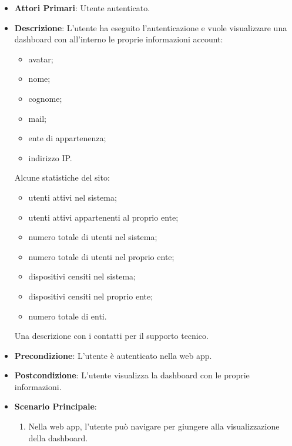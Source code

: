 		\begin{itemize}
			\item \textbf{Attori Primari}: Utente autenticato.
			\item \textbf{Descrizione}: L'utente ha eseguito l'autenticazione e vuole visualizzare una dashboard con all'interno le proprie informazioni account:
			\begin{itemize}
			 	\item avatar;
			 	\item nome;
			 	\item cognome;
			 	\item mail;
			 	\item ente di appartenenza;
			 	\item indirizzo IP.
			 \end{itemize}
			  Alcune statistiche del sito:
			  \begin{itemize}
			   	\item utenti attivi nel sistema;
			   	\item utenti attivi appartenenti al proprio ente;
			   	\item numero totale di utenti nel sistema;
			   	\item numero totale di utenti nel proprio ente;
			   	\item dispositivi censiti nel sistema;
			   	\item dispositivi censiti nel proprio ente;
			   	\item numero totale di enti.
			   \end{itemize}
			   Una descrizione con i contatti per il supporto tecnico.
			\item \textbf{Precondizione}: L'utente è autenticato nella web app.
			\item \textbf{Postcondizione}: L'utente visualizza la dashboard con le proprie informazioni.
			\item \textbf{Scenario Principale}:
			\begin{enumerate}
				\item Nella web app, l'utente può navigare per giungere alla visualizzazione della dashboard.
			\end{enumerate}	
		\end{itemize}


